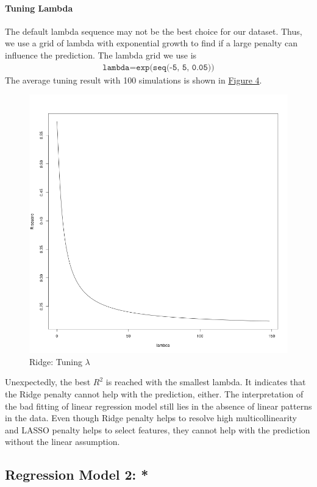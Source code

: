 \documentclass[8pt]{article}
\begin{document}
\paragraph{Tuning Lambda}
The default lambda sequence may not be the best choice for our dataset.
Thus, we use a grid of lambda with exponential growth to find 
if a large penalty can influence the prediction. The lambda grid we use is 
\begin{align*}
    \texttt{lambda} = \texttt{exp(seq(-5, 5, 0.05))}
\end{align*}
The average tuning result with 100 simulations is shown in \hyperref[fig:lambda]{Figure 4}.
\begin{figure}[H]
    \centering
    \includegraphics*[scale=0.25]{figures/lambda.png}
    \caption{Ridge: Tuning $\lambda$}
\label{fig:lambda}
\end{figure}
Unexpectedly, the best $R^2$ is reached with the smallest lambda. 
It indicates that the Ridge penalty cannot help with the prediction, either. 
The interpretation of the bad fitting of linear regression model still lies in the absence of linear patterns in the data.
Even though Ridge penalty helps to resolve high multicollinearity and LASSO penalty 
helps to select features, they cannot help with the prediction without the linear assumption.

\subsection{Regression Model 2: *}
\end{document}
